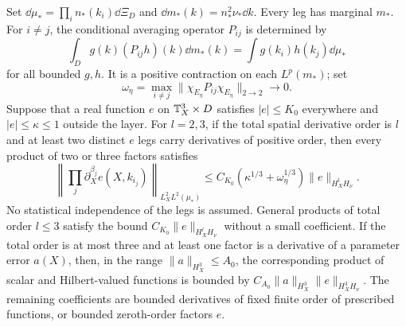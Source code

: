 \begin{lemma}\label{geom:moser}
Set $\dd\mu_* =\prod_i n_*(k_i)\dd\Xi_D$ and
$\dd m_*(k)=n_*^2\nu_*\dd k$. Every leg has marginal $m_*$.
For $i\ne j$, the conditional averaging operator $P_{ij}$ is determined by
\[
 \int_D g(k)(P_{ij}h)(k)\dd m_*(k)
    =\int g(k_i)h(k_j)\dd\mu_*
\]
for all bounded $g,h$.
It is a positive contraction on each $L^p(m_*)$; set
\[
 \omega_\eta=\max_{i\ne j}
       \|\chi_{E_\eta}P_{ij}\chi_{E_\eta}\|_{2\to2}\longrightarrow0.
\]
Suppose that a real function $e$ on $\mathbb T^3_X\times D$ satisfies
$|e|\le K_0$ everywhere and $|e|\le\kappa\le1$ outside the layer.
For $l=2,3$, if the total spatial derivative order is $l$ and
at least two distinct $e$ legs carry derivatives of positive order,
then every product of two or three factors satisfies
\begin{equation}\label{geom:localizedmoser}
 \left\|\prod_j\partial_X^{\beta_j}e(X,k_{i_j})\right\|_{L^2_XL^2(\mu_*)}
 \le C_{K_0}(\kappa^{1/3}+\omega_\eta^{1/3})
                          \|e\|_{H^l_XH_\nu}.
\end{equation}
No statistical independence of the legs is assumed.
General products of total order $l\le3$ satisfy the bound
$C_{K_0}\|e\|_{H^l_XH_\nu}$ without a small coefficient.
If the total order is at most three and at least one factor is a
derivative of a parameter error $a(X)$, then, in the range
$\|a\|_{H^3_X}\le A_0$, the corresponding product of scalar and
Hilbert-valued functions is bounded by
$C_{A_0}\|a\|_{H^3_X}\|e\|_{H^3_XH_\nu}$.
The remaining coefficients are bounded derivatives of fixed finite
order of prescribed functions, or bounded zeroth-order factors $e$.
\end{lemma}
